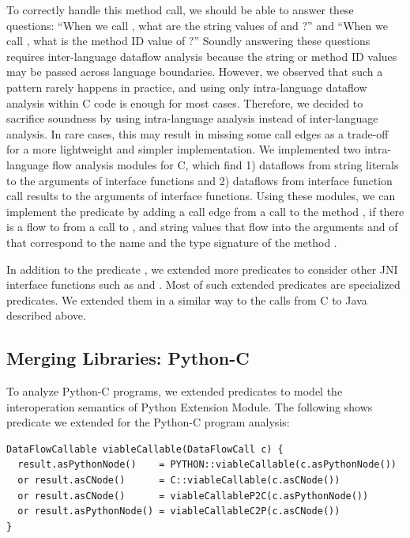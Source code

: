 To correctly handle this method call, we should be able to answer these
questions: ``When we call , what are the string values of
 and ?'' and ``When we call ,
what is the method ID value of ?'' Soundly answering these questions
requires inter-language dataflow analysis because the string or method ID
values may be passed across language boundaries.  However, we observed that
such a pattern rarely happens in practice, and using only intra-language
dataflow analysis within C code is enough for most cases.  Therefore, we
decided to sacrifice soundness by using intra-language analysis instead of
inter-language analysis.
In rare cases, this may result in missing some call edges
as a trade-off for a more lightweight and simpler
implementation.  We implemented two intra-language flow analysis modules for C,
which find 1) dataflows from string literals to the arguments of interface
functions and 2) dataflows from interface function call results to the
arguments of interface functions.  Using these modules, we can implement the
predicate  by adding a call edge from a
 call to the method , if there is a flow to
 from a call to , and string values that flow
into the arguments  and  of  that
correspond to the name and the type signature of the method .

In addition to the predicate , we extended more
predicates to consider other JNI interface functions such as 
and .  Most of such extended predicates are specialized
 predicates.  We extended them in a similar way to the calls from
C to Java described above.

\subsection{Merging Libraries: Python-C}\label{sec:merging2}
To analyze Python-C programs, we extended predicates to model the
interoperation semantics of Python Extension Module.  The following shows
 predicate we extended for the Python-C program
analysis:

\begin{lstlisting}[style=codeql,xleftmargin=-.5em,numbers=none]
DataFlowCallable viableCallable(DataFlowCall c) {
  result.asPythonNode()    = PYTHON::viableCallable(c.asPythonNode())
  or result.asCNode()      = C::viableCallable(c.asCNode())
  or result.asCNode()      = viableCallableP2C(c.asPythonNode())
  or result.asPythonNode() = viableCallableC2P(c.asCNode())
}
\end{lstlisting}

